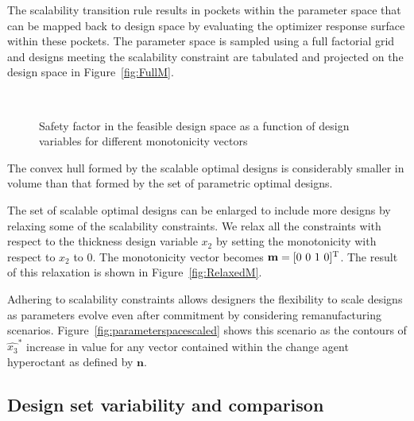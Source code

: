 The scalability transition rule results in pockets within the parameter space that can be mapped back to design space by evaluating the optimizer response surface within these pockets. The parameter space is sampled using a full factorial grid and designs meeting the scalability constraint are tabulated and projected on the design space in Figure~\ref{fig:FullM}.
\begin{figure*}[h!]
	\centering
	\\
	\caption{Safety factor in the feasible design space as a function of design variables for different monotonicity vectors}
	\label{fig:designspace}
\end{figure*}

The convex hull formed by the scalable optimal designs is considerably smaller in volume than that formed by the set of parametric optimal designs.

 The set of scalable optimal designs can be enlarged to include more designs by relaxing some of the scalability constraints. We relax all the constraints with respect to the thickness design variable $x_2$ by setting the monotonicity with respect to $x_2$ to $0$. The monotonicity vector becomes $\mathbf{m} = [0~0~1~0]^{\text T}$. The result of this relaxation is shown in Figure~\ref{fig:RelaxedM}.

Adhering to scalability constraints allows designers the flexibility to scale designs as parameters evolve even after commitment by considering remanufacturing scenarios. Figure~\ref{fig:parameterspacescaled} shows this scenario as the contours of $\hat{x_3}^{*}$ increase in value for any vector contained within the change agent hyperoctant as defined by $\mathbf{n}$.

\subsection{Design set variability and comparison} \label{subsec:dspacevar}

